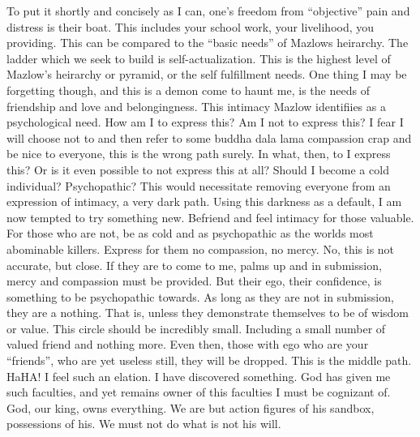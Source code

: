 \qquad To put it shortly and concisely as I can, one's freedom from
``objective'' pain and distress is their boat. This includes your school
work, your livelihood, you providing. This can be compared to the
``basic needs'' of Mazlows heirarchy. The ladder which we seek to build
is self-actualization. This is the highest level of Mazlow's heirarchy
or pyramid, or the self fulfillment needs. One thing I may be forgetting
though, and this is a demon come to haunt me, is the needs of friendship
and love and belongingness. This intimacy Mazlow identifiies as a
psychological need. How am I to express this? Am I not to express this?
I fear I will choose not to and then refer to some buddha dala lama
compassion crap and be nice to everyone, this is the wrong path surely.
In what, then, to I express this? Or is it even possible to not express
this at all? Should I become a cold individual? Psychopathic? This would
necessitate removing everyone from an expression of intimacy, a very
dark path. Using this darkness as a default, I am now tempted to try
something new. Befriend and feel intimacy for those valuable. For those
who are not, be as cold and as psychopathic as the worlds most
abominable killers. Express for them no compassion, no mercy. No, this
is not accurate, but close. If they are to come to me, palms up and in
submission, mercy and compassion must be provided. But their ego, their
confidence, is something to be psychopathic towards. As long as they are
not in submission, they are a nothing. That is, unless they demonstrate
themselves to be of wisdom or value. This circle should be incredibly
small. Including a small number of valued friend and nothing more. Even
then, those with ego who are your ``friends'', who are yet useless
still, they will be dropped. This is the middle path. HaHA! I feel such
an elation. I have discovered something. God has given me such
faculties, and yet remains owner of this faculties I must be cognizant
of. God, our king, owns everything. We are but action figures of his
sandbox, possessions of his. We must not do what is not his will.

